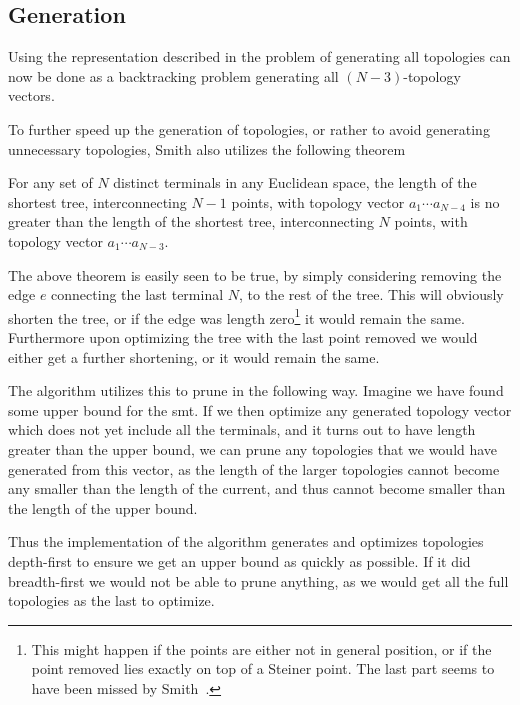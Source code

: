 \subsection{Generation}
\label{sec:generation}

Using the representation described in  the problem of
generating all topologies can now be done as a backtracking problem generating
all $(N-3)$-topology vectors.

To further speed up the generation of topologies, or rather to avoid generating
unnecessary topologies, Smith also utilizes the following theorem

\begin{theorem} For any set of $N$ distinct terminals in any Euclidean space,
the length of the shortest tree, interconnecting $N-1$ points, with topology
vector $a_1 \cdots a_{N-4}$ is no greater than the length of the shortest tree,
interconnecting $N$ points, with topology vector $a_1 \cdots a_{N-3}$.
\end{theorem}

The above theorem is easily seen to be true, by simply considering removing the
edge $e$ connecting the last terminal $N$, to the rest of the tree.  This will
obviously shorten the tree, or if the edge was length zero\footnote{This might
happen if the points are either not in general position, or if the point removed
lies exactly on top of a Steiner point.  The last part seems to have been missed
by Smith~\cite[p.~144]{Smith1992}.} it would remain the same.  Furthermore upon
optimizing the tree with the last point removed we would either get a further
shortening, or it would remain the same.

The algorithm utilizes this to prune in the following way.  Imagine we have
found some upper bound for the \gls{smt}.  If we then optimize any generated
topology vector which does not yet include all the terminals, and it turns out
to have length greater than the upper bound, we can prune any topologies that we
would have generated from this vector, as the length of the larger topologies
cannot become any smaller than the length of the current, and thus cannot become
smaller than the length of the upper bound.

Thus the implementation of the algorithm generates and optimizes topologies
depth-first to ensure we get an upper bound as quickly as possible.  If it did
breadth-first we would not be able to prune anything, as we would get all the
full topologies as the last to optimize.

